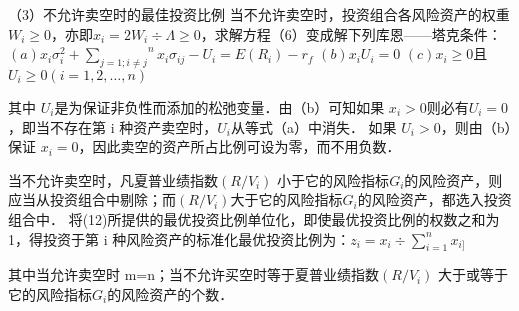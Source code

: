
（3）不允许卖空时的最佳投资比例
当不允许卖空时，投资组合各风险资产的权重$W_{i}\geqslant0$，亦即$x_{i}=2W_{i}{\div}\Lambda\geqslant0$，求解方程（6）变成解下列库恩——塔克条件：
$(a) x_{i}{\sigma_{i}^{2}}+{{\sum_{j=1;i\ne j}}^{n}}x_{i}{\sigma_{ij}}-U_{i}=E(R_{i})-r_{f}$
$(b)x_{i}U_{i}=0$
$(c)x_{i}\geqslant0$且$U_{i}\geqslant0$$(i=1,2,\dots,n)$

其中 $U_{i}$是为保证非负性而添加的松弛变量．由（b）可知如果 $x_{i}>0$则必有$U_{i}=0$，即当不存在第 i 种资产卖空时，$U_{i}$从等式（a）中消失． 如果 $U_{i}>0$，则由（b）保证 $x_{i}=0$，因此卖空的资产所占比例可设为零，而不用负数．


当不允许卖空时，凡夏普业绩指数$(R/V_{i})$ 小于它的风险指标$G_{i}$的风险资产，则应当从投资组合中剔除；而$(R/V_{i})$大于它的风险指标$G_{i}$的风险资产，都选入投资组合中．
 将(12)所提供的最优投资比例单位化，即使最优投资比例的权数之和为1，得投资于第 i 种风险资产的标准化最优投资比例为：$z_{i}=x_{i}\div {\sum_{i=1}^{n}x_{i]}}$
 
其中当允许卖空时 m=n；当不允许买空时等于夏普业绩指数$(R/V_{i})$ 大于或等于它的风险指标$G_{i}$的风险资产的个数．




